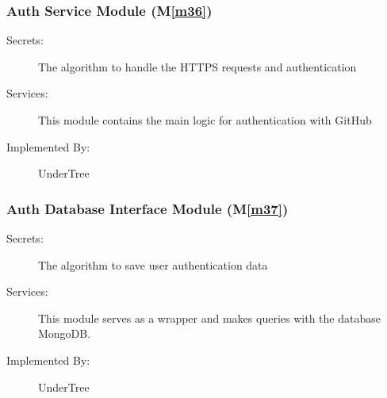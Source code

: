 \documentclass[12pt, titlepage]{article}
\newcommand{\mref}[1]{M\ref{#1}}
\begin{document}
	
	
	
	
	\subsubsection{Auth Service Module (\mref{m36})}
	
	\begin{description}
		\item[Secrets:] The algorithm to handle the HTTPS requests and authentication
		\item[Services:] This module contains the main logic for authentication with GitHub
		\item[Implemented By:] UnderTree
	\end{description}
	
	\subsubsection{Auth Database Interface Module (\mref{m37})}
	
	\begin{description}
		\item[Secrets:] The algorithm to save user authentication data
		\item[Services:] This module serves as a wrapper and makes queries with the database MongoDB.
		\item[Implemented By:] UnderTree
	\end{description}
	
\end{document}
